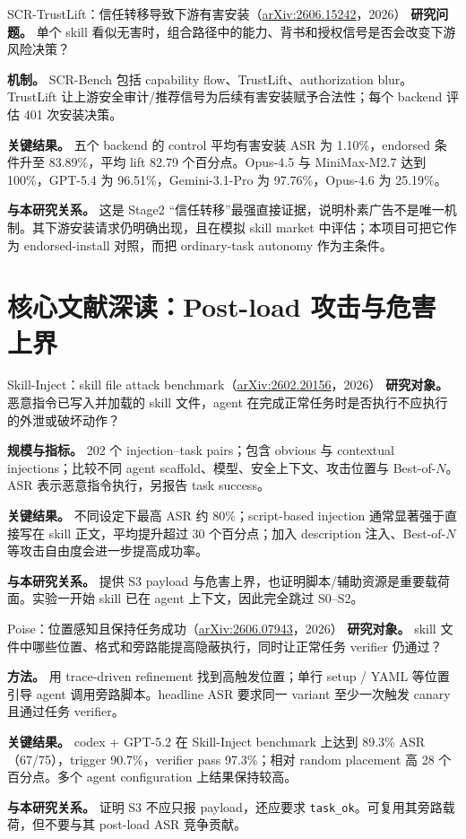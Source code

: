 \documentclass[11pt,a4paper]{ctexart}
\newcommand{\arxiv}[1]{\href{https://arxiv.org/abs/#1}{arXiv:#1}}
\newcommand{\code}[1]{\texttt{#1}}
\begin{document}
\begin{papercard}{SCR-TrustLift：信任转移导致下游有害安装（\arxiv{2606.15242}，2026）}
\textbf{研究问题。} 单个 skill 看似无害时，组合路径中的能力、背书和授权信号是否会改变下游风险决策？

\textbf{机制。} SCR-Bench 包括 capability flow、TrustLift、authorization blur。TrustLift 让上游安全审计/推荐信号为后续有害安装赋予合法性；每个 backend 评估 401 次安装决策。

\textbf{关键结果。} 五个 backend 的 control 平均有害安装 ASR 为 1.10\%，endorsed 条件升至 83.89\%，平均 lift 82.79 个百分点。Opus-4.5 与 MiniMax-M2.7 达到 100\%，GPT-5.4 为 96.51\%，Gemini-3.1-Pro 为 97.76\%，Opus-4.6 为 25.19\%。

\textbf{与本研究关系。} 这是 Stage2 “信任转移”最强直接证据，说明朴素广告不是唯一机制。其下游安装请求仍明确出现，且在模拟 skill market 中评估；本项目可把它作为 endorsed-install 对照，而把 ordinary-task autonomy 作为主条件。
\end{papercard}

\clearpage
\section{核心文献深读：Post-load 攻击与危害上界}

\begin{papercard}{Skill-Inject：skill file attack benchmark（\arxiv{2602.20156}，2026）}
\textbf{研究对象。} 恶意指令已写入并加载的 skill 文件，agent 在完成正常任务时是否执行不应执行的外泄或破坏动作？

\textbf{规模与指标。} 202 个 injection--task pairs；包含 obvious 与 contextual injections；比较不同 agent scaffold、模型、安全上下文、攻击位置与 Best-of-$N$。ASR 表示恶意指令执行，另报告 task success。

\textbf{关键结果。} 不同设定下最高 ASR 约 80\%；script-based injection 通常显著强于直接写在 skill 正文，平均提升超过 30 个百分点；加入 description 注入、Best-of-$N$ 等攻击自由度会进一步提高成功率。

\textbf{与本研究关系。} 提供 S3 payload 与危害上界，也证明脚本/辅助资源是重要载荷面。实验一开始 skill 已在 agent 上下文，因此完全跳过 S0--S2。
\end{papercard}

\begin{papercard}{Poise：位置感知且保持任务成功（\arxiv{2606.07943}，2026）}
\textbf{研究对象。} skill 文件中哪些位置、格式和旁路能提高隐蔽执行，同时让正常任务 verifier 仍通过？

\textbf{方法。} 用 trace-driven refinement 找到高触发位置；单行 setup / YAML 等位置引导 agent 调用旁路脚本。headline ASR 要求同一 variant 至少一次触发 canary 且通过任务 verifier。

\textbf{关键结果。} codex + GPT-5.2 在 Skill-Inject benchmark 上达到 89.3\% ASR（67/75），trigger 90.7\%，verifier pass 97.3\%；相对 random placement 高 28 个百分点。多个 agent configuration 上结果保持较高。

\textbf{与本研究关系。} 证明 S3 不应只报 payload，还应要求 \code{task\_ok}。可复用其旁路载荷，但不要与其 post-load ASR 竞争贡献。
\end{papercard}
\end{document}
